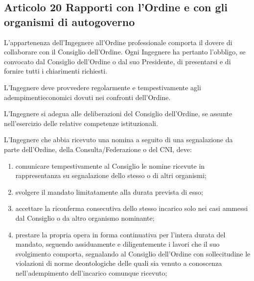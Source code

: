 \documentclass[letterpaper,10pt,italian]{sphinxmanual}
\begin{document}
\subsection{Articolo 20 \sphinxhyphen{} Rapporti con l’Ordine e con gli organismi di autogoverno}
\label{\detokenize{capitoli/codice/codice_deontologico:articolo-20-rapporti-con-lordine-e-con-gli-organismi-di-autogoverno}}\begin{description}
\sphinxAtStartPar
L’appartenenza dell’Ingegnere all’Ordine professionale comporta il dovere di collaborare con il Consiglio dell’Ordine. Ogni Ingegnere ha pertanto l’obbligo, se convocato dal Consiglio dell’Ordine o dal suo Presidente, di presentarsi e di fornire tutti i chiarimenti richiesti.

\sphinxAtStartPar
L’Ingegnere deve provvedere regolarmente e tempestivamente agli adempimentieconomici dovuti nei confronti dell’Ordine.

\sphinxAtStartPar
L’Ingegnere si adegua alle deliberazioni del Consiglio dell’Ordine, se assunte nell’esercizio delle relative competenze istituzionali.

\sphinxAtStartPar
L’Ingegnere che abbia ricevuto una nomina a seguito di una segnalazione da parte dell’Ordine, della Consulta/Federazione o del CNI, deve:
\begin{enumerate}
%
\item {} 
\sphinxAtStartPar
comunicare tempestivamente al Consiglio le nomine ricevute in rappresentanza su segnalazione dello stesso o di altri organismi;

\item {} 
\sphinxAtStartPar
svolgere il mandato limitatamente alla durata prevista di esso;

\item {} 
\sphinxAtStartPar
accettare la riconferma consecutiva dello stesso incarico solo nei casi ammessi dal Consiglio o da altro organismo nominante;

\item {} 
\sphinxAtStartPar
prestare la propria opera in forma continuativa per l’intera durata del mandato, seguendo assiduamente e diligentemente i lavori che il suo svolgimento comporta, segnalando al Consiglio dell’Ordine con sollecitudine le violazioni di norme deontologiche delle quali sia venuto a conoscenza nell’adempimento dell’incarico comunque ricevuto;


\end{enumerate}
\end{description}
\end{document}
